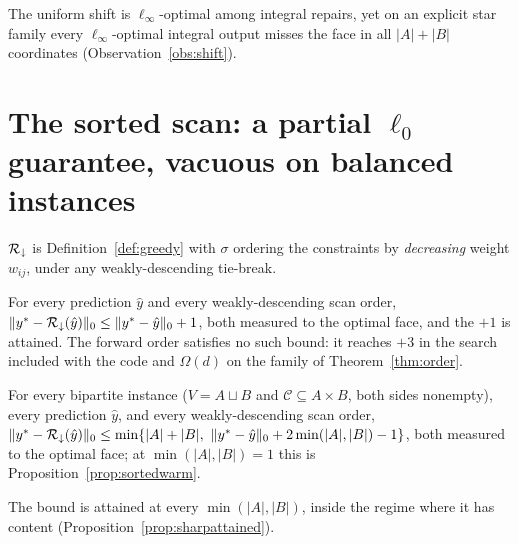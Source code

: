 The uniform shift is $\ell_\infty$-optimal among integral repairs, yet on an explicit star family
every $\ell_\infty$-optimal integral output misses the face in all $|A|+|B|$ coordinates
(Observation~\ref{obs:shift}).

\section{The sorted scan: a partial \texorpdfstring{$\ell_0$}{l0} guarantee, vacuous on balanced instances}\label{sec:sorted}

\begin{definition}\label{def:sorted}
$\mathcal{R}_{\downarrow}$ is Definition~\ref{def:greedy} with $\sigma$ ordering the constraints by
\emph{decreasing} weight $w_{ij}$, under any weakly-descending tie-break.
\end{definition}

\begin{proposition}[Warm start, $|A| = 1$]\label{prop:sortedwarm}
For every prediction $\hat{y}$ and every weakly-descending scan order,
$\|y^* - \mathcal{R}_{\downarrow}(\hat{y})\|_0 \le \|y^* - \hat{y}\|_0 + 1$,
both measured to the optimal face, and the $+1$ is attained. The forward order satisfies no such
bound: it reaches $+3$ in the search included with the code and $\Omega(d)$ on the family of
Theorem~\ref{thm:order}.
\end{proposition}

\begin{theorem}\label{thm:sharpwarm}
For every bipartite instance ($V = A \sqcup B$ and ${\mathcal{C} \subseteq A \times B}$, both sides
nonempty), every prediction $\hat{y}$, and every weakly-descending scan order,
$\|y^* - \mathcal{R}_{\downarrow}(\hat{y})\|_0 \le \min\{|A| + |B|,\ \|y^* - \hat{y}\|_0 + 2\min(|A|,|B|) - 1\}$,
both measured to the optimal face; at $\min(|A|,|B|) = 1$ this is
Proposition~\ref{prop:sortedwarm}.
\end{theorem}

The bound is attained at every $\min(|A|,|B|)$, inside the regime where it has content
(Proposition~\ref{prop:sharpattained}).

\smallskip
\noindent{}
\smallskip

